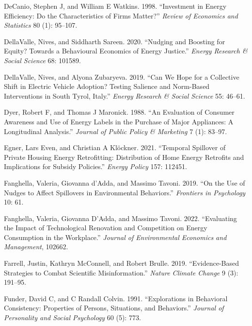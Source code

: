 \documentclass[
  12pt,
  captions=heading]{scrreport}
\newlength{\cslhangindent}
\newlength{\cslentryspacingunit} %
\newenvironment{CSLReferences}[2] %
 {%
  \setlength{\parindent}{0pt}
  \ifodd #1
  \let\oldpar\par
  \def\par{\hangindent=\cslhangindent\oldpar}
  \fi
  \setlength{\parskip}{#2\cslentryspacingunit}
 }%
 {}
\begin{document}
\begin{CSLReferences}{1}{0}
\leavevmode{}%
DeCanio, Stephen J, and William E Watkins. 1998. {``Investment in Energy
Efficiency: Do the Characteristics of Firms Matter?''} \emph{Review of
Economics and Statistics} 80 (1): 95--107.

\leavevmode{}%
DellaValle, Nives, and Siddharth Sareen. 2020. {``Nudging and Boosting
for Equity? Towards a Behavioural Economics of Energy Justice.''}
\emph{Energy Research \& Social Science} 68: 101589.

\leavevmode{}%
DellaValle, Nives, and Alyona Zubaryeva. 2019. {``Can We Hope for a
Collective Shift in Electric Vehicle Adoption? Testing Salience and
Norm-Based Interventions in South Tyrol, Italy.''} \emph{Energy Research
\& Social Science} 55: 46--61.

\leavevmode{}%
Dyer, Robert F, and Thomas J Maronick. 1988. {``An Evaluation of
Consumer Awareness and Use of Energy Labels in the Purchase of Major
Appliances: A Longitudinal Analysis.''} \emph{Journal of Public Policy
\& Marketing} 7 (1): 83--97.

\leavevmode{}%
Egner, Lars Even, and Christian A Klöckner. 2021. {``Temporal Spillover
of Private Housing Energy Retrofitting: Distribution of Home Energy
Retrofits and Implications for Subsidy Policies.''} \emph{Energy Policy}
157: 112451.

\leavevmode{}%
Fanghella, Valeria, Giovanna d'Adda, and Massimo Tavoni. 2019. {``On the
Use of Nudges to Affect Spillovers in Environmental Behaviors.''}
\emph{Frontiers in Psychology} 10: 61.

\leavevmode{}%
Fanghella, Valeria, Giovanna D'Adda, and Massimo Tavoni. 2022.
{``Evaluating the Impact of Technological Renovation and Competition on
Energy Consumption in the Workplace.''} \emph{Journal of Environmental
Economics and Management}, 102662.

\leavevmode{}%
Farrell, Justin, Kathryn McConnell, and Robert Brulle. 2019.
{``Evidence-Based Strategies to Combat Scientific Misinformation.''}
\emph{Nature Climate Change} 9 (3): 191--95.

\leavevmode{}%
Funder, David C, and C Randall Colvin. 1991. {``Explorations in
Behavioral Consistency: Properties of Persons, Situations, and
Behaviors.''} \emph{Journal of Personality and Social Psychology} 60
(5): 773.


\end{CSLReferences}
\end{document}

